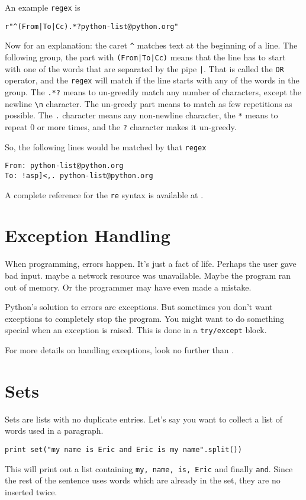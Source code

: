 \documentclass[a4paper,oneside]{book}
\numberwithin{equation}{chapter}
\begin{document}
An example \texttt{regex} is 
\begin{verbatim}
r"^(From|To|Cc).*?python-list@python.org"
\end{verbatim}
Now for an explanation: the caret \verb|^| matches text at the beginning of a line. The following group, the part with \verb&(From|To|Cc)& means that the line has to start with one of the words that are separated by the pipe \verb&|&. That is called the \texttt{OR} operator, and the \texttt{regex} will match if the line starts with any of the words in the group. The \verb|.*?| means to un-greedily match any number of characters, except the newline \verb|\n| character. The un-greedy part means to match as few repetitions as possible. The \verb|.| character means any non-newline character, the \verb|*| means to repeat 0 or more times, and the \verb|?| character makes it un-greedy.

So, the following lines would be matched by that \texttt{regex} 
\begin{verbatim}
From: python-list@python.org 
To: !asp]<,. python-list@python.org
\end{verbatim}

A complete reference for the \texttt{re} syntax is available at \cite{4}.
\section{Exception Handling}
When programming, errors happen. It's just a fact of life. Perhaps the user gave bad input. maybe a network resource was unavailable. Maybe the program ran out of memory. Or the programmer may have even made a mistake.

Python's solution to errors are exceptions. But sometimes you don't want exceptions to completely stop the program. You might want to do something special when an exception is raised. This is done in a \texttt{try/except} block.

For more details on handling exceptions, look no further than \cite{5}.
\section{Sets}
Sets are lists with no duplicate entries. Let's say you want to collect a list of words used in a paragraph.
\begin{verbatim}
print set("my name is Eric and Eric is my name".split())
\end{verbatim}
This will print out a list containing \texttt{my, name, is, Eric} and finally \texttt{and}. Since the rest of the sentence uses words which are already in the set, they are no inserted twice.
\end{document}
